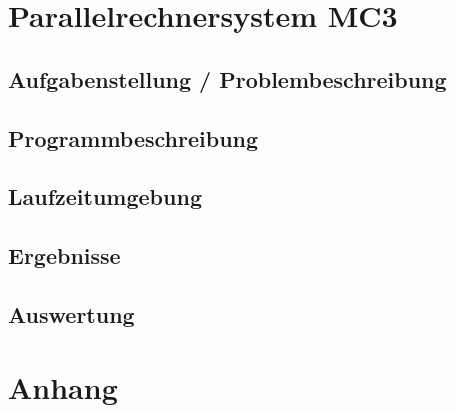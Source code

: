 \documentclass[a4paper,12pt]{scrartcl}
\begin{document}
\section{Parallelrechnersystem MC3}
\subsection{Aufgabenstellung / Problembeschreibung}
\subsection{Programmbeschreibung}
\subsection{Laufzeitumgebung}
\subsection{Ergebnisse}
\subsection{Auswertung}

\section{Anhang}
\end{document}
